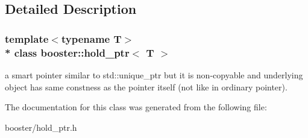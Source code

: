 \subsection{Detailed Description}
\subsubsection*{template$<$typename T$>$\\*
class booster\+::hold\+\_\+ptr$<$ T $>$}

a smart pointer similar to std\+::unique\+\_\+ptr but it is non-\/copyable and underlying object has same constness as the pointer itself (not like in ordinary pointer). 

The documentation for this class was generated from the following file\+:\begin{DoxyCompactItemize}
\item 
booster/hold\+\_\+ptr.\+h\end{DoxyCompactItemize}
